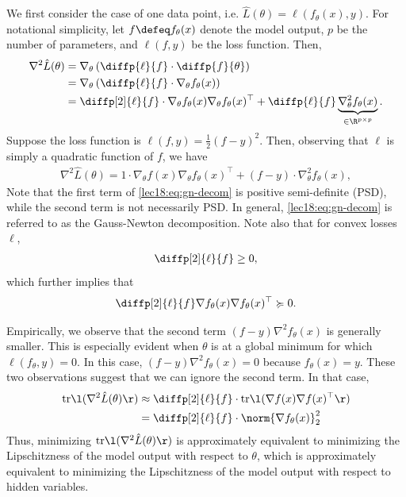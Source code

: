 We first consider the case of one data point, i.e. $\hat{L}(\theta) = \ell(f_\theta(x), y)$. For notational simplicity, let $f \defeq f_{\theta}(x)$ denote the model output, $p$ be the number of parameters, and $\ell(f,y)$ be the loss function. Then,
\begin{align}
    \nabla^2\hat{L}(\theta) &= \nabla_\theta \left(\diffp{\ell}{f}  \cdot \diffp{f}{\theta}\right) \\
    &= \nabla_\theta \left(\diffp{\ell}{f} \cdot \nabla_\theta f_\theta(x) \right) \\
    &= \diffp[2]{\ell}{f} \cdot \nabla_\theta f_{\theta}(x)\nabla_\theta f_{\theta}(x)^\top + \diffp{\ell}{f}\underbrace{\nabla_\theta^2 f_{\theta}(x)}_{\in \R^{p \times p}}.
\end{align}
Suppose the loss function is $\ell(f,y) = \frac{1}{2}(f-y)^2$. Then, observing that $\ell$ is simply a quadratic function of $f$, we have
\begin{align}\label{lec18:eq:gn-decom}
    \nabla^2\hat{L}(\theta) = 1 \cdot \nabla_\theta f(x) \nabla_\theta f_\theta(x)^\top + (f-y)\cdot\nabla^2_\theta f_\theta (x),   
\end{align}
Note that the first term of \eqref{lec18:eq:gn-decom} is positive semi-definite (PSD), while the second term is not necessarily PSD. In general, \eqref{lec18:eq:gn-decom} is referred to as the Gauss-Newton decomposition. Note also that for convex losses $\ell$, 
\begin{align}
    \diffp[2]{\ell}{f} \geq 0,
\end{align}
which further implies that
\begin{align}
    \diffp[2]{\ell}{f}\nabla f_\theta (x) \nabla f_\theta (x)^\top \succcurlyeq 0.   
\end{align}

Empirically, we observe that the second term $(f-y)\nabla^2f_{\theta}(x)$ is generally smaller. This is especially evident when $\theta$ is at a global minimum for which $\ell(f_\theta, y) = 0$. In this case, $(f-y)\nabla^2f_{\theta}(x)=0$ because $f_{\theta}(x)=y$. These two observations suggest that we can ignore the second term. In that case,
\begin{align}
    \mathrm{tr}\l (\nabla^2\hat{L}(\theta) \r ) &\approx \diffp[2]{\ell}{f} \cdot \mathrm{tr}\l (\nabla f(x)\nabla f(x)^\top\r ) \\
    &=\diffp[2]{\ell}{f} \cdot \norm{\nabla  f_{\theta}(x)}_2^2
\end{align}
Thus, minimizing $\mathrm{tr}\l (\nabla^2\hat{L}(\theta)\r )$ is approximately equivalent to minimizing the Lipschitzness of the model output with respect to $\theta$, which is approximately equivalent to minimizing the Lipschitzness of the model output with respect to hidden variables.

